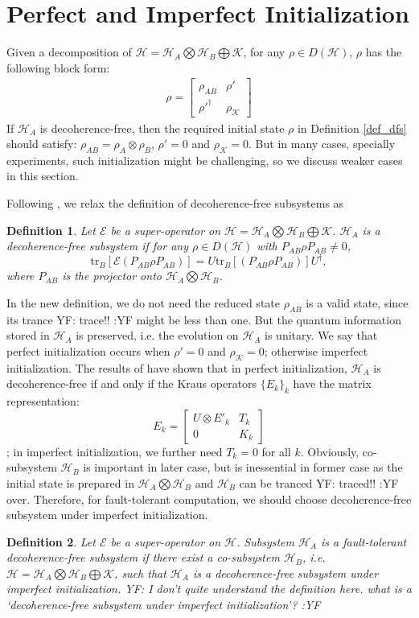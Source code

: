 \documentclass[journal]{IEEEtran}
\def\h{\ensuremath{\mathcal{H}}}
\def\k{\ensuremath{\mathcal{K}}}
\def\e{\ensuremath{\mathcal{E}}}
\def\k{\mathcal{K}}
\newtheorem{definition}{Definition}
\newcommand{\authorComment}[3]{\color{#1}#2: {#3} :#2\color{black}}
\newcommand{\yf}[1]{\authorComment{blue}{YF}{#1}}
\begin{document}
\section{Perfect and Imperfect Initialization}
 Given a decomposition of $\h=\h_A\bigotimes \h_B\bigoplus\k$, for any $\rho\in D(\h)$, $\rho$ has the following block form:
  \begin{eqnarray}
  \rho=\left[ \begin{matrix}
  \rho_{AB}&\rho'\\
  \rho'^\dagger&\rho_\k
  \end{matrix}\right]
\end{eqnarray}
If $\h_A$ is decoherence-free, then the required initial state $\rho$ in Definition \ref{def_dfs} should satisfy: $\rho_{AB}=\rho_A\otimes \rho_B$, $\rho'=0$ and $\rho_\k=0$. 
  But in many cases, specially experiments,  such initialization might be challenging, so we discuss weaker cases in this section.

 Following \cite{shabani2005theory}, we relax the definition of decoherence-free subsystems as
 \begin{definition}
   Let $\e$ be a super-operator on $\h=\h_A\bigotimes\h_B\bigoplus\k $.
   $\h_A$ is a decoherence-free subsystem if for any $\rho\in D(\h)$ with $P_{AB}\rho P_{AB}\not =0$, $$\textrm{tr}_{B}[\e(P_{AB}\rho P_{AB})]=U\textrm{tr}_{B}[(P_{AB}\rho P_{AB})]U^\dagger,$$
   where $P_{AB}$ is the projector onto $\h_A\bigotimes \h_B$.
 \end{definition}

In the new definition, we do not need the reduced state $\rho_{AB}$ is a valid state, since its trance \yf{trace!!} might be less than one. But the quantum  information stored in $\h_A$ is preserved, i.e. the evolution on $\h_A$ is unitary. We say that perfect initialization occurs when $\rho'=0$ and $\rho_{\k}=0$; otherwise imperfect initialization. The results of \cite{shabani2005theory} have shown that in perfect initialization, $\h_A$ is decoherence-free if and only if the Kraus operators $\{E_k\}_k$ have the matrix representation:
$$E_{k}=\left [\begin{matrix}
  U\otimes E'_{k}&T_k\\
  0&K_k
\end{matrix}\right]$$
; in imperfect initialization, we further need  $T_{k}=0$ for all $k$.
Obviously, co-subsystem $\h_B$ is important in later case, but is inessential in former case as the initial state is prepared in $\h_A\bigotimes \h_B$ and $\h_B$ can be tranced  \yf{traced!!} over. Therefore, for fault-tolerant computation, we should choose decoherence-free subsystem under imperfect initialization.  
\begin{definition}\label{Def_new_dfs}
  Let $\e$ be a super-operator on $\h$.  Subsystem $\h_A$  is a fault-tolerant decoherence-free subsystem if there exist a co-subsystem $\h_B$, i.e. $\h=\h_A\bigotimes \h_B\bigoplus\k$, such that $\h_A$ is a decoherence-free subsystem under imperfect initialization. \yf{I don't quite understand the definition here. what is a `decoherence-free subsystem under imperfect initialization'?}
\end{definition}
\end{document}
